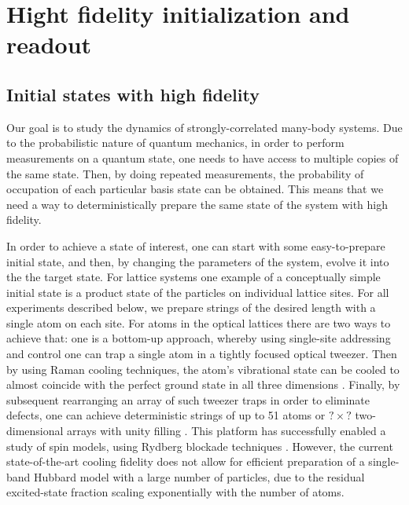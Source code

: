 \chapter{Hight fidelity initialization and readout}

\section{Initial states with high fidelity}

Our goal is to study the dynamics of strongly-correlated many-body systems. Due to the probabilistic nature of quantum mechanics, in order to perform measurements on a quantum state, one needs to have access to multiple copies of the same state. Then, by doing repeated measurements, the probability of occupation of each particular basis state can be obtained. This means that we need a way to deterministically prepare the same state of the system with high fidelity. 

In order to achieve a state of interest, one can start with some easy-to-prepare initial state, and then, by changing the parameters of the system, evolve it into the the target state. For lattice systems one example of a conceptually simple initial state is a product state of the particles on individual lattice sites. For all experiments described below, we prepare strings of the desired length with a single atom on each site. For atoms in the optical lattices there are two ways to achieve that: one is a bottom-up approach, whereby using single-site addressing and control one can trap a single atom in a tightly focused optical tweezer. Then by using Raman cooling techniques, the atom's vibrational state can be cooled to almost coincide with the perfect ground state in all three dimensions \cite{adamo, selim}. Finally, by subsequent rearranging an array of such tweezer traps in order to eliminate defects, one can achieve deterministic strings of up to 51 atoms \cite{misha} or $?\times?$ two-dimensional arrays with unity filling \cite{broweys}. This platform has successfully enabled a study of spin models, using Rydberg blockade techniques \cite{misha}. However, the current state-of-the-art cooling fidelity does not allow for efficient preparation of a single-band Hubbard model with a large number of particles, due to the residual excited-state fraction scaling exponentially with the number of atoms.

